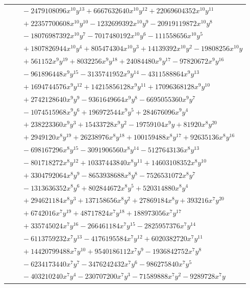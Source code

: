 \documentclass[11pt]{article}
\begin{document}
\begin{longtable}{@{}ll@{}}
 & $\quad -2479108096x^{10}y^{13}+6667632640x^{10}y^{12}+22069604352x^{10}y^{11}$\\
 & $\quad +22357700608x^{10}y^{10}-1232699392x^{10}y^{9}-20919119872x^{10}y^{8}$\\
 & $\quad -18076987392x^{10}y^{7}-7017480192x^{10}y^{6}-111558656x^{10}y^{5}$\\
 & $\quad +1807826944x^{10}y^{4}+805474304x^{10}y^{3}+14139392x^{10}y^{2}-19808256x^{10}y$\\
 & $\quad +561152x^{9}y^{19}+8032256x^{9}y^{18}+24084480x^{9}y^{17}-97820672x^{9}y^{16}$\\
 & $\quad -961896448x^{9}y^{15}-3135741952x^{9}y^{14}-4311588864x^{9}y^{13}$\\
 & $\quad +1694744576x^{9}y^{12}+14215856128x^{9}y^{11}+17096368128x^{9}y^{10}$\\
 & $\quad +2742128640x^{9}y^{9}-9361649664x^{9}y^{8}-6695055360x^{9}y^{7}$\\
 & $\quad -1074515968x^{9}y^{6}+196972544x^{9}y^{5}+284676096x^{9}y^{4}$\\
 & $\quad +238223360x^{9}y^{3}+15433728x^{9}y^{2}-19759104x^{9}y+81920x^{8}y^{20}$\\
 & $\quad +2949120x^{8}y^{19}+26238976x^{8}y^{18}+100159488x^{8}y^{17}+92635136x^{8}y^{16}$\\
 & $\quad -698167296x^{8}y^{15}-3091906560x^{8}y^{14}-5127643136x^{8}y^{13}$\\
 & $\quad -801718272x^{8}y^{12}+10337443840x^{8}y^{11}+14603108352x^{8}y^{10}$\\
 & $\quad +3304792064x^{8}y^{9}-8653938688x^{8}y^{8}-7526531072x^{8}y^{7}$\\
 & $\quad -1313636352x^{8}y^{6}+802844672x^{8}y^{5}+520314880x^{8}y^{4}$\\
 & $\quad +294621184x^{8}y^{3}+137158656x^{8}y^{2}+27869184x^{8}y+393216x^{7}y^{20}$\\
 & $\quad +6742016x^{7}y^{19}+48717824x^{7}y^{18}+188973056x^{7}y^{17}$\\
 & $\quad +335745024x^{7}y^{16}-266461184x^{7}y^{15}-2825957376x^{7}y^{14}$\\
 & $\quad -6113759232x^{7}y^{13}-4176195584x^{7}y^{12}+6020382720x^{7}y^{11}$\\
 & $\quad +14420799488x^{7}y^{10}+9540186112x^{7}y^{9}-1936842752x^{7}y^{8}$\\
 & $\quad -6234173440x^{7}y^{7}-3476242432x^{7}y^{6}-986275840x^{7}y^{5}$\\
 & $\quad -403210240x^{7}y^{4}-230707200x^{7}y^{3}-71589888x^{7}y^{2}-9289728x^{7}y$\\

\end{longtable}
\end{document}
